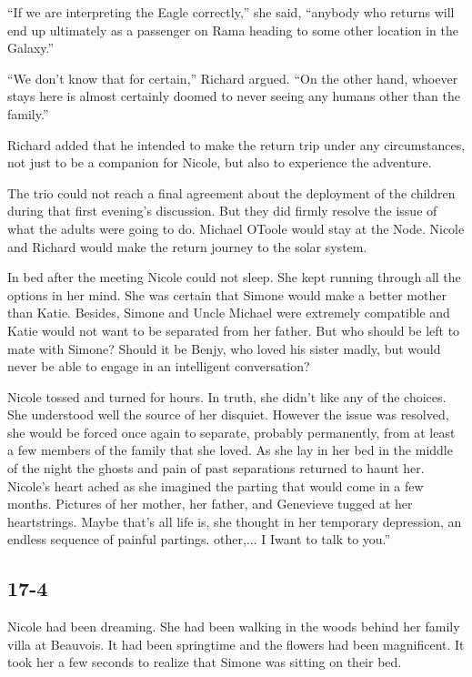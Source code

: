 \documentclass[]{article}
\begin{document}
{“If we are interpreting the Eagle correctly,” she said, “anybody who returns will end up ultimately as a passenger on Rama heading to some other location in the Galaxy.”

“We don’t know that for certain,” Richard argued. “On the other hand, whoever stays here is almost certainly doomed to never seeing any humans other than the family.”

Richard added that he intended to make the return trip under any circumstances, not just to be a companion for Nicole, but also to experience the adventure.

The trio could not reach a final agreement about the deployment of the children during that first evening’s discussion. But they did firmly resolve the issue of what the adults were going to do. Michael OToole would stay at the Node. Nicole and Richard would make the return journey to the solar system.

In bed after the meeting Nicole could not sleep. She kept running through all the options in her mind. She was certain that Simone would make a better mother than Katie. Besides, Simone and Uncle Michael were extremely compatible and Katie would not want to be separated from her father. But who should be left to mate with Simone? Should it be Benjy, who loved his sister madly, but would never be able to engage in an intelligent conversation?

Nicole tossed and turned for hours. In truth, she didn’t like any of the choices. She understood well the source of her disquiet. However the issue was resolved, she would be forced once again to separate, probably permanently, from at least a few members of the family that she loved. As she lay in her bed in the middle of the night the ghosts and pain of past separations returned to haunt her. Nicole’s heart ached as she imagined the parting that would come in a few months. Pictures of her mother, her father, and Genevieve tugged at her heartstrings. Maybe that’s all life is, she thought in her temporary depression, an endless sequence of painful partings. other,... I Iwant to talk to you.”

\subsection{17-4}

Nicole had been dreaming. She had been walking in the woods behind her family villa at Beauvois. It had been springtime and the flowers had been magnificent. It took her a few seconds to realize that Simone was sitting on their bed.

}
\end{document}
